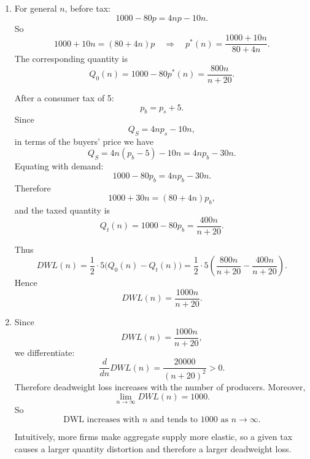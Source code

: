 \documentclass[12pt]{article}
\begin{document}
\begin{enumerate}[label=(\alph*)]
\begin{center}
    \end{center}

    \item
    For general \(n\), before tax:
    \[
    1000-80p=4np-10n.
    \]
    So
    \[
    1000+10n=(80+4n)p
    \quad\Longrightarrow\quad
    p^*(n)=\frac{1000+10n}{80+4n}.
    \]
    The corresponding quantity is
    \[
    Q_0(n)=1000-80p^*(n)=\frac{800n}{n+20}.
    \]

    After a consumer tax of 5:
    \[
    p_b=p_s+5.
    \]
    Since
    \[
    Q_S=4np_s-10n,
    \]
    in terms of the buyers' price we have
    \[
    Q_S=4n(p_b-5)-10n=4np_b-30n.
    \]
    Equating with demand:
    \[
    1000-80p_b=4np_b-30n.
    \]
    Therefore
    \[
    1000+30n=(80+4n)p_b,
    \]
    and the taxed quantity is
    \[
    Q_t(n)=1000-80p_b=\frac{400n}{n+20}.
    \]

    Thus
    \[
    DWL(n)=\frac12\cdot 5\bigl(Q_0(n)-Q_t(n)\bigr)
    =\frac12\cdot 5\left(\frac{800n}{n+20}-\frac{400n}{n+20}\right).
    \]
    Hence
    \[
    \boxed{DWL(n)=\frac{1000n}{n+20}.}
    \]

    \item
    Since
    \[
    DWL(n)=\frac{1000n}{n+20},
    \]
    we differentiate:
    \[
    \frac{d}{dn}DWL(n)=\frac{20000}{(n+20)^2}>0.
    \]
    Therefore deadweight loss increases with the number of producers. Moreover,
    \[
    \lim_{n\to\infty}DWL(n)=1000.
    \]
    So
    \[
    \boxed{\text{DWL increases with }n\text{ and tends to }1000\text{ as }n\to\infty.}
    \]

    Intuitively, more firms make aggregate supply more elastic, so a given tax causes a larger quantity distortion and therefore a larger deadweight loss.
\end{enumerate}
\end{document}
